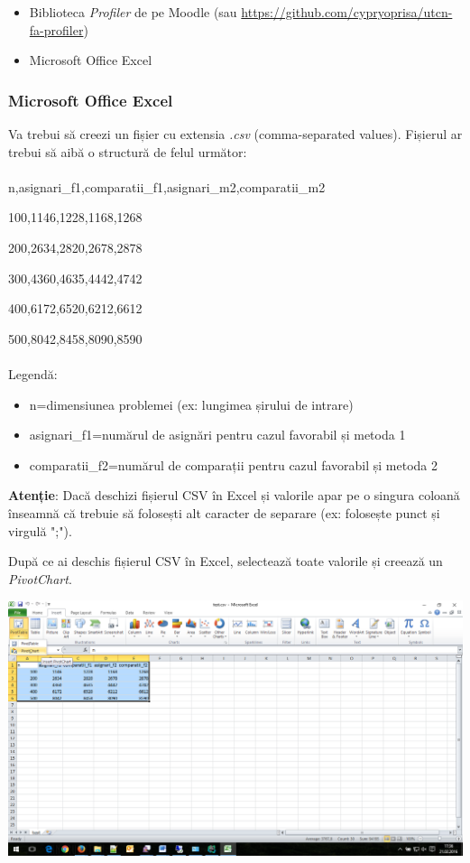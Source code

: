 \documentclass[../ro-fa-lab.tex]{subfiles}
\begin{document}
\begin{itemize}
\item
  Biblioteca \emph{Profiler} de pe Moodle (sau
  \url{https://github.com/cypryoprisa/utcn-fa-profiler})
\end{itemize}

\begin{itemize}
\item
  Microsoft Office Excel
\end{itemize}

\subsubsection{Microsoft Office Excel}\label{microsoft-office-excel}

Va trebui să creezi un fișier cu extensia \emph{.csv} (comma-separated
values). Fișierul ar trebui să aibă o structură de felul următor:\\\\

n,asignari\_f1,comparatii\_f1,asignari\_m2,comparatii\_m2

100,1146,1228,1168,1268

200,2634,2820,2678,2878

300,4360,4635,4442,4742

400,6172,6520,6212,6612

500,8042,8458,8090,8590
\\\\
Legendă:

\begin{itemize}
\item
  n=dimensiunea problemei (ex: lungimea șirului de intrare)
\item
  asignari\_f1=numărul de asignări pentru cazul favorabil și metoda 1
\item
  comparatii\_f2=numărul de comparații pentru cazul favorabil și metoda
  2
\end{itemize}

\textbf{Atenție}: Dacă deschizi fișierul CSV în Excel și valorile apar
pe o singura coloană înseamnă că trebuie să folosești alt caracter de
separare (ex: folosește punct și virgulă ";").

După ce ai deschis fișierul CSV în Excel, selectează toate valorile și
creează un \emph{PivotChart}.

\includegraphics[width=\textwidth]{../Resources/lab0/image11.png}
\end{document}
